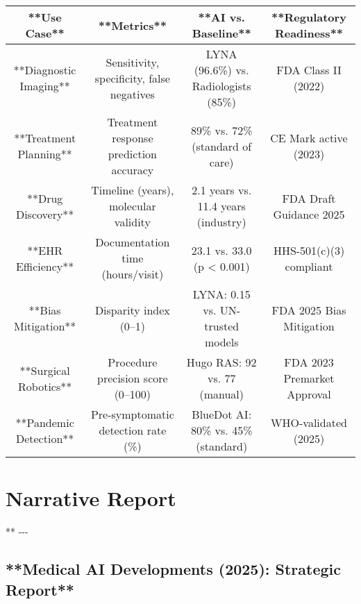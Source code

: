 \documentclass{article}%
\begin{document}
\begin{tabular}{|cccc|}%
\hline%
**Use Case**&**Metrics**&**AI vs. Baseline**&**Regulatory Readiness**\\%
\hline%
**Diagnostic Imaging**&Sensitivity, specificity, false negatives&LYNA (96.6\%) vs. Radiologists (85\%)&FDA Class II (2022)\\%
**Treatment Planning**&Treatment response prediction accuracy&89\% vs. 72\% (standard of care)&CE Mark active (2023)\\%
**Drug Discovery**&Timeline (years), molecular validity&2.1 years vs. 11.4 years (industry)&FDA Draft Guidance 2025\\%
**EHR Efficiency**&Documentation time (hours/visit)&23.1 vs. 33.0 (p < 0.001)&HHS{-}501(c)(3) compliant\\%
**Bias Mitigation**&Disparity index (0–1)&LYNA: 0.15 vs. UN{-}trusted models&FDA 2025 Bias Mitigation\\%
**Surgical Robotics**&Procedure precision score (0–100)&Hugo RAS: 92 vs. 77 (manual)&FDA 2023 Premarket Approval\\%
**Pandemic Detection**&Pre{-}symptomatic detection rate (\%)&BlueDot AI: 80\% vs. 45\% (standard)&WHO{-}validated (2025)\\%
\hline%
\end{tabular}

%
\section{Narrative Report}%
\label{sec:NarrativeReport}%
**\newline%
%
{-}{-}{-}\newline%
%
\subsection{**Medical AI Developments (2025): Strategic Report**}%
\label{subsec:**MedicalAIDevelopments(2025)StrategicReport**}%
\end{document}
